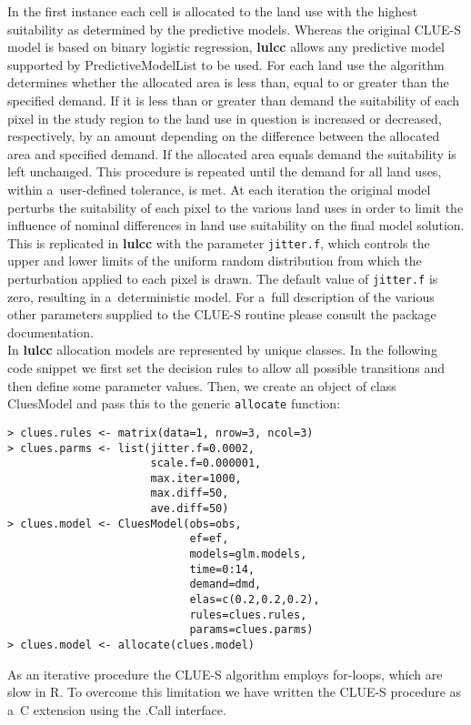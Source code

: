 \documentclass[gmdd, online, hvmath]{copernicus}
\begin{document}
In the first instance each cell is allocated to the land use with the highest suitability as determined by the predictive models. Whereas the original CLUE-S model is based on binary logistic regression, \textbf{lulcc} allows any predictive model supported by PredictiveModelList to be used. For each land use the algorithm determines whether the allocated area is less than, equal to or greater than the specified demand. If it is less than or greater than demand the suitability of each pixel in the study region to the land use in question is increased or decreased, respectively, by an amount depending on the difference between the allocated area and specified demand. If the allocated area equals demand the suitability is left unchanged. This procedure is repeated until the demand for all land uses, within a~user-defined tolerance, is met. At each iteration the original model perturbs the suitability of each pixel to the various land uses in order to limit the influence of nominal differences in land use suitability on the final model solution. This is replicated in \textbf{lulcc} with the parameter \texttt{jitter.f}, which controls the upper and lower limits of the uniform random distribution from which the perturbation applied to each pixel is drawn. The default value of \texttt{jitter.f} is zero, resulting in a~deterministic model. For a~full description of the various other parameters supplied to the CLUE-S routine please consult the package documentation. \\

In \textbf{lulcc} allocation models are represented by unique classes. In the following code snippet we first set the decision rules to allow all possible transitions and then define some parameter values. Then, we create an object of class CluesModel and pass this to the generic \texttt{allocate} function:
\begin{verbatim}
> clues.rules <- matrix(data=1, nrow=3, ncol=3) 
> clues.parms <- list(jitter.f=0.0002, 
                      scale.f=0.000001, 
                      max.iter=1000, 
                      max.diff=50, 
                      ave.diff=50) 
> clues.model <- CluesModel(obs=obs, 
                            ef=ef, 
                            models=glm.models, 
                            time=0:14, 
                            demand=dmd, 
                            elas=c(0.2,0.2,0.2), 
                            rules=clues.rules, 
                            params=clues.parms) 
> clues.model <- allocate(clues.model)
\end{verbatim}\hack{\noindent}As an iterative procedure the CLUE-S algorithm employs for-loops, which are slow in R. To overcome this limitation we have written the CLUE-S procedure as a~C extension using the .Call interface. \\
\end{document}
